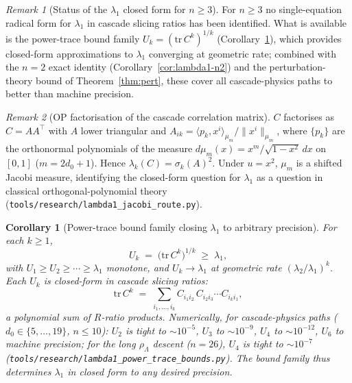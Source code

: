 \documentclass[12pt,a4paper]{article}
\newtheorem{corollary}[theorem]{Corollary}
\theoremstyle{remark}
\newtheorem*{remark}{Remark}
\begin{document}
\begin{remark}[Status of the $\lambda_1$ closed form for $n \geq 3$]\label{rem:lambda1-no-closed-form}
For $n \geq 3$ no single-equation radical form for $\lambda_1$ in cascade slicing ratios has been identified. What is available is the power-trace bound family $U_k = (\mathrm{tr}\,C^k)^{1/k}$ (Corollary~\ref{cor:lambda1-power-trace}), which provides closed-form approximations to $\lambda_1$ converging at geometric rate; combined with the $n = 2$ exact identity (Corollary~\ref{cor:lambda1-n2}) and the perturbation-theory bound of Theorem~\ref{thm:pert}, these cover all cascade-physics paths to better than machine precision.
\end{remark}

\begin{remark}[OP factorisation of the cascade correlation matrix]\label{rem:lambda1-OP-factorisation}
$C$ factorises as $C = A A^{\top}$ with $A$ lower triangular and $A_{ik} = \langle p_k, x^i\rangle_{\mu_m} / \|x^i\|_{\mu_m}$, where $\{p_k\}$ are the orthonormal polynomials of the measure $d\mu_m(x) = x^m/\sqrt{1-x^2}\,dx$ on $[0,1]$ ($m = 2 d_0 + 1$). Hence $\lambda_k(C) = \sigma_k(A)^2$. Under $u = x^2$, $\mu_m$ is a shifted Jacobi measure, identifying the closed-form question for $\lambda_1$ as a question in classical orthogonal-polynomial theory (\texttt{tools/research/lambda1\_jacobi\_route.py}).
\end{remark}

\begin{corollary}[Power-trace bound family closing $\lambda_1$ to arbitrary precision]\label{cor:lambda1-power-trace}
For each $k \geq 1$,
\[
U_k \;=\; \bigl(\mathrm{tr}\,C^k\bigr)^{1/k} \;\geq\; \lambda_1,
\]
with $U_1 \geq U_2 \geq \cdots \geq \lambda_1$ monotone, and $U_k \to \lambda_1$ at geometric rate $(\lambda_2/\lambda_1)^k$. Each $U_k$ is closed-form in cascade slicing ratios:
\[
\mathrm{tr}\,C^k \;=\; \sum_{i_1, \ldots, i_k} C_{i_1 i_2}\,C_{i_2 i_3} \cdots C_{i_k i_1},
\]
a polynomial sum of $R$-ratio products. Numerically, for cascade-physics paths ($d_0 \in \{5, \ldots, 19\}$, $n \leq 10$): $U_2$ is tight to $\sim 10^{-5}$, $U_3$ to $\sim 10^{-9}$, $U_4$ to $\sim 10^{-12}$, $U_6$ to machine precision; for the long $\rho_\Lambda$ descent ($n = 26$), $U_4$ is tight to $\sim 10^{-7}$ (\texttt{tools/research/lambda1\_power\_trace\_bounds.py}). The bound family thus determines $\lambda_1$ in closed form to any desired precision.
\end{corollary}
\end{document}
